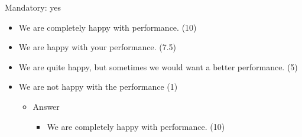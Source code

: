Mandatory: yes 

\begin{itemize}
	\item We are completely happy with performance. (10) 
	\item We are happy with your performance. (7.5) 
	\item We are quite happy, but sometimes we would want a better performance. (5) 
	\item We are not happy with the performance (1)
	
	\begin{itemize}
		\item Answer
					\begin{itemize}
						\item 	 		We are completely happy with performance. (10) 
					\end{itemize}
	\end{itemize}

\end{itemize}